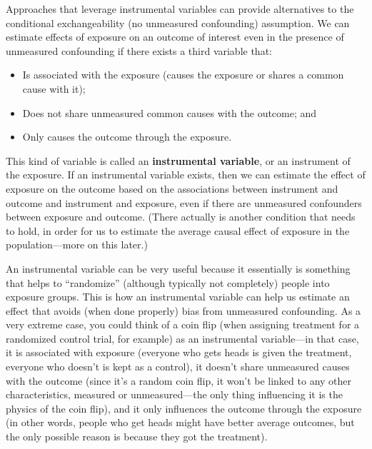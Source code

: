 \documentclass[
]{book}
\providecommand{\tightlist}{%
  \setlength{\itemsep}{0pt}\setlength{\parskip}{0pt}}
\begin{document}
Approaches that leverage instrumental variables can provide alternatives to the conditional exchangeability (no unmeasured confounding) assumption. We can estimate effects of exposure on an outcome of interest even in the presence of unmeasured confounding if there exists a third variable that:

\begin{itemize}
\tightlist
\item
  Is associated with the exposure (causes the exposure or shares a common cause with it);
\item
  Does not share unmeasured common causes with the outcome; and
\item
  Only causes the outcome through the exposure.
\end{itemize}

This kind of variable is called an \textbf{instrumental variable}, or an instrument of the exposure.
If an instrumental variable exists, then we can estimate the effect of exposure on the
outcome based on the associations between instrument and outcome and instrument
and exposure, even if there are unmeasured confounders between exposure and outcome.
(There actually is another condition that needs to hold, in order for us to estimate
the average causal effect of exposure in the population---more on this later.)

An instrumental variable can be very useful because it essentially is something
that helps to ``randomize'' (although typically not completely) people into
exposure groups. This is how an instrumental variable can help us estimate an
effect that avoids (when done properly) bias from unmeasured confounding. As
a very extreme case, you could think of a coin flip (when assigning treatment
for a randomized control trial, for example) as an instrumental variable---in
that case, it is associated with exposure (everyone who gets heads is given
the treatment, everyone who doesn't is kept as a control), it doesn't share
unmeasured causes with the outcome (since it's a random coin flip, it won't
be linked to any other characteristics, measured or unmeasured---the only thing
influencing it is the physics of the coin flip), and it only influences the
outcome through the exposure (in other words, people who get heads might
have better average outcomes, but the only possible reason is because they
got the treatment).
\end{document}
